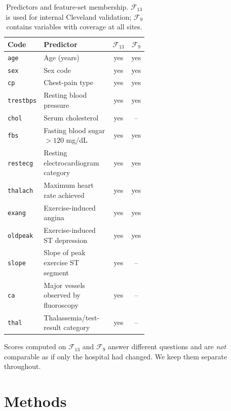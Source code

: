 \documentclass[manuscript,nonacm]{acmart}
\begin{document}
\begin{table}[t]
\centering
\caption{Predictors and feature-set membership. $\mathcal{F}_{13}$ is used for internal
Cleveland validation; $\mathcal{F}_{9}$ contains variables with coverage at all sites.}
\label{tab:predictors}
\scriptsize
\begin{tabular}{@{}lp{0.55\linewidth}cc@{}}
\toprule
Code & Predictor & $\mathcal{F}_{13}$ & $\mathcal{F}_{9}$\\
\midrule
\texttt{age} & Age (years) & yes & yes\\
\texttt{sex} & Sex code & yes & yes\\
\texttt{cp} & Chest-pain type & yes & yes\\
\texttt{trestbps} & Resting blood pressure & yes & yes\\
\texttt{chol} & Serum cholesterol & yes & --\\
\texttt{fbs} & Fasting blood sugar $>120$ mg/dL & yes & yes\\
\texttt{restecg} & Resting electrocardiogram category & yes & yes\\
\texttt{thalach} & Maximum heart rate achieved & yes & yes\\
\texttt{exang} & Exercise-induced angina & yes & yes\\
\texttt{oldpeak} & Exercise-induced ST depression & yes & yes\\
\texttt{slope} & Slope of peak exercise ST segment & yes & --\\
\texttt{ca} & Major vessels observed by fluoroscopy & yes & --\\
\texttt{thal} & Thalassemia/test-result category & yes & --\\
\bottomrule
\end{tabular}
\end{table}

Scores computed on $\mathcal{F}_{13}$ and $\mathcal{F}_{9}$ answer different questions
and are \emph{not} comparable as if only the hospital had changed. We keep them
separate throughout.

\section{Methods}
\end{document}
